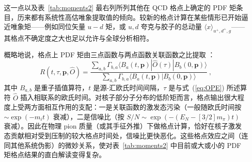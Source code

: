 这一点以及表~\ref{tab:moments2} 最右列所列其他在 QCD 格点上确定的 PDF 矩条目，历来都有系统性高估唯象提取值的倾向。较新的格点计算在某些情形已开始逼近唯象矩——例如同位矢量 $u\!-\!d$ 矩，或 $u, d$ 夸克与胶子的总动量 $\langle x \rangle_{u^+,d^+,g}$——其格点不确定度之大也足以允许与全球分析相符。

概略地说，格点上 PDF 矩由三点函数与两点函数关联函数之比提取
\cite{Gockeler:1995wg,Lin:2017snn}：
\begin{equation}
	R(t,\tau,\mathbf{p},\hat{O}) = \frac{\sum_{a,b} \Gamma_{b,a} \langle B_a(t,\mathbf{p}) | \hat{O}(\tau) |
	B_b(0,\mathbf{p}) \rangle}{\sum_{a,b} \Gamma_{b,a} \langle B_a(t,\mathbf{p}) | B_b(0,\mathbf{p}) \rangle}\ ,
\end{equation}
其中 $B_{a,b}$ 是重子插值算符，$t$ 是源-汇欧氏时间间隔，$\tau$ 是与式~(\ref{eq:OPE}) 所述算符 $\hat{O}$ 插入相联系的欧氏时间。对核子部分子分布的低阶矩而言，格点输出很大程度上受两方面相互作用的支配：一是关联函数的激发态污染（一般随欧氏时间按 $\sim\! \exp{(-m_i t)}$ 衰减），二是信噪比（按 $S/N\! \sim\! \exp{(-(E_N -[3/2]m_\pi) t)}$ 衰减）。因此在物理 pion 质量（或其手征外推）下做格点计算，恰好在核子激发态贡献相对受到压制的较大格点时间处，信噪比更快恶化。这些格点效应之间（连同其他系统伪影）的微妙关系，使对表~\ref{tab:moments2} 中目前或大或小的 PDF 矩格点结果的直白解读变得复杂。



\clearpage
